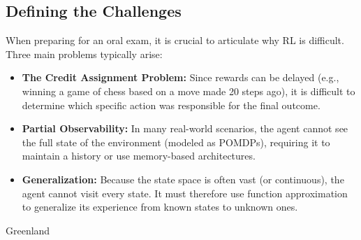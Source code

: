 \subsection{Defining the Challenges}
When preparing for an oral exam, it is crucial to articulate why RL is difficult. Three main problems typically arise:
\begin{itemize}
    \item \textbf{The Credit Assignment Problem:} Since rewards can be delayed (e.g., winning a game of chess based on a move made 20 steps ago), it is difficult to determine which specific action was responsible for the final outcome.
    \item \textbf{Partial Observability:} In many real-world scenarios, the agent cannot see the full state of the environment (modeled as POMDPs), requiring it to maintain a history or use memory-based architectures.
    \item \textbf{Generalization:} Because the state space is often vast (or continuous), the agent cannot visit every state. It must therefore use function approximation to generalize its experience from known states to unknown ones.
\end{itemize}
 Greenland
